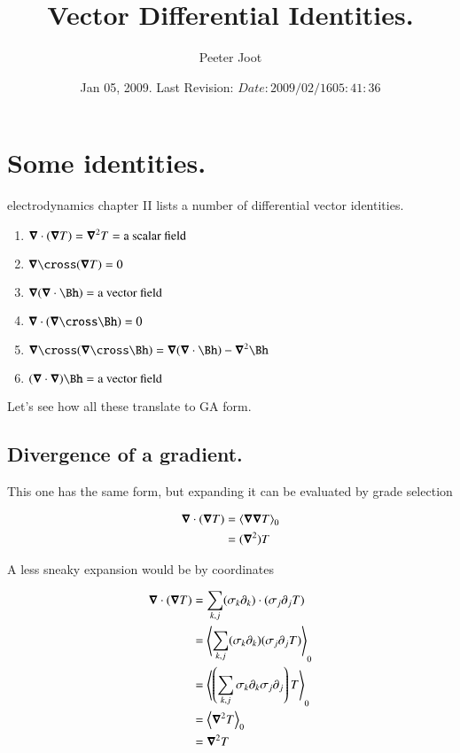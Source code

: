 \documentclass{article}
\title{ Vector Differential Identities. }
\author{Peeter Joot}
\date{ Jan 05, 2009.  Last Revision: $Date: 2009/02/16 05:41:36 $ }
\begin{document}
\maketitle{}
\section{ Some identities. }

\cite{feynman1963flp} electrodynamics chapter II lists a number of
differential vector identities.

\begin{enumerate}
\item $\boldsymbol{\nabla} \cdot (\boldsymbol{\nabla} T) = \boldsymbol{\nabla}^2 T = \mbox{a scalar field}$
\item $\spacegrad \cross (\spacegrad T) = 0$
\item $\spacegrad (\spacegrad \cdot \Bh) = \mbox{a vector field}$
\item $\spacegrad \cdot (\spacegrad \cross \Bh) = 0$
\item $\spacegrad \cross (\spacegrad \cross \Bh) = \spacegrad(\spacegrad \cdot \Bh) - \spacegrad^2 \Bh$
\item $(\spacegrad \cdot \spacegrad) \Bh = \mbox{a vector field}$
\end{enumerate}

Let's see how all these translate to GA form.

\subsection{ Divergence of a gradient. }

This one has the same form, but expanding it can be evaluated by grade
selection

\begin{align*}
\boldsymbol{\nabla} \cdot (\boldsymbol{\nabla} T) 
&= {\left\langle{{\boldsymbol{\nabla}\boldsymbol{\nabla}T}}\right\rangle}_{0} \\
&= (\boldsymbol{\nabla}^2) T
\end{align*}

A less sneaky expansion would be by coordinates

\begin{align*}
\boldsymbol{\nabla} \cdot (\boldsymbol{\nabla} T) 
&= {\sum_{k,j} (\sigma_k \partial_k) \cdot (\sigma_j \partial_j T)} \\
&= {\left\langle{{\sum_{k,j} (\sigma_k \partial_k) (\sigma_j \partial_j T)}}\right\rangle}_{0} \\
&= {\left\langle{{\left(\sum_{k,j} \sigma_k \partial_k \sigma_j \partial_j\right) T}}\right\rangle}_{0} \\
&= {\left\langle{{\boldsymbol{\nabla}^2 T}}\right\rangle}_{0} \\
&= \boldsymbol{\nabla}^2 T \\
\end{align*}
\end{document}
